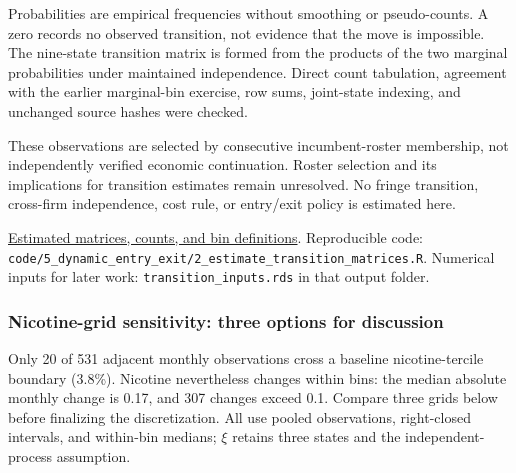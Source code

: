 \documentclass[10pt,]{article}
\begin{document}
Probabilities are empirical frequencies without smoothing or
pseudo-counts. A zero records no observed transition, not evidence that
the move is impossible. The nine-state transition matrix is formed from
the products of the two marginal probabilities under maintained
independence. Direct count tabulation, agreement with the earlier
marginal-bin exercise, row sums, joint-state indexing, and unchanged
source hashes were checked.

These observations are selected by consecutive incumbent-roster
membership, not independently verified economic continuation. Roster
selection and its implications for transition estimates remain
unresolved. No fringe transition, cross-firm independence, cost rule, or
entry/exit policy is estimated here.

\href{../../output/dynamic_entry_exit/independent_transitions_2026-11-03/README.txt}{Estimated
matrices, counts, and bin definitions}. Reproducible code:
\texttt{code/5\_dynamic\_entry\_exit/2\_estimate\_transition\_matrices.R}.
Numerical inputs for later work: \texttt{transition\_inputs.rds} in that
output folder.

\subsubsection{Nicotine-grid sensitivity: three options for
discussion}\label{nicotine-grid-sensitivity-three-options-for-discussion}

Only 20 of 531 adjacent monthly observations cross a baseline
nicotine-tercile boundary (3.8\%). Nicotine nevertheless changes within
bins: the median absolute monthly change is 0.17, and 307 changes exceed
0.1. Compare three grids below before finalizing the discretization. All
use pooled observations, right-closed intervals, and within-bin medians;
\(\xi\) retains three states and the independent-process assumption.
\end{document}
